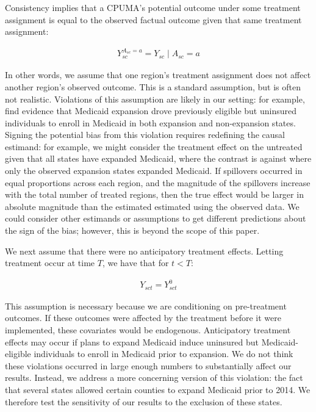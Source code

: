 \documentclass[aoas]{imsart}
\theoremstyle{plain}
\theoremstyle{remark}
\begin{document}
Consistency implies that a CPUMA's potential outcome under some treatment assignment is equal to the observed factual outcome given that same treatment assignment: 

\begin{align*}
Y_{sc}^{A_{sc} = a} = Y_{sc} \mid A_{sc} = a
\end{align*}

In other words, we assume that one region's treatment assignment does not affect another region's observed outcome. This is a standard assumption, but is often not realistic. Violations of this assumption are likely in our setting: for example, \cite{frean2017premium} find evidence that Medicaid expansion drove previously eligible but uninsured individuals to enroll in Medicaid in both expansion and non-expansion states. Signing the potential bias from this violation requires redefining the causal estimand: for example, we might consider the treatment effect on the untreated given that all states have expanded Medicaid, where the contrast is against where only the observed expansion states expanded Medicaid. If spillovers occurred in equal proportions across each region, and the magnitude of the spillovers increase with the total number of treated regions, then the true effect would be larger in absolute magnitude than the estimated estimated using the observed data. We could consider other estimands or assumptions to get different predictions about the sign of the bias; however, this is beyond the scope of this paper.

We next assume that there were no anticipatory treatment effects. Letting treatment occur at time $T$, we have that for $t < T$:

\begin{align*}
Y_{sct} = Y_{sct}^0
\end{align*}

This assumption is necessary because we are conditioning on pre-treatment outcomes. If these outcomes were affected by the treatment before it were implemented, these covariates would be endogenous. Anticipatory treatment effects may occur if plans to expand Medicaid induce uninsured but Medicaid-eligible individuals to enroll in Medicaid prior to expansion. We do not think these violations occurred in large enough numbers to substantially affect our results. Instead, we address a more concerning version of this violation: the fact that several states allowed certain counties to expand Medicaid prior to 2014. We therefore test the sensitivity of our results to the exclusion of these states.
\end{document}
